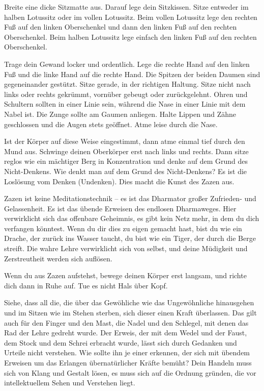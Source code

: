 \documentclass[10pt,a4paper]{article}
\begin{document}
\vskip 4pt
Breite eine dicke Sitzmatte aus. Darauf lege dein Sitzkissen. Sitze entweder im halben Lotussitz oder im vollen
Lotussitz. Beim vollen Lotussitz lege den rechten Fuß auf den linken Oberschenkel und dann den linken Fuß auf
den rechten Oberschenkel. Beim halben Lotussitz lege einfach den linken Fuß auf den rechten Oberschenkel.

\vskip 4pt
Trage dein Gewand locker und ordentlich. Lege die rechte Hand auf den linken Fuß und die linke Hand auf die
rechte Hand. Die Spitzen der beiden Daumen sind gegeneinander gestützt. Sitze gerade, in der richtigen Haltung.
Sitze nicht nach links oder rechts gekrümmt, vornüber gebeugt oder zurückgelehnt. Ohren und Schultern sollten
in einer Linie sein, während die Nase in einer Linie mit dem Nabel ist. Die Zunge sollte am Gaumen anliegen. Halte
Lippen und Zähne geschlossen und die Augen stets geöffnet. Atme leise durch die Nase.

\vskip 4pt
Ist der Körper auf diese Weise eingestimmt, dann atme einmal tief durch den Mund aus. Schwinge deinen
Oberkörper erst nach links und rechts. Dann sitze reglos wie ein mächtiger Berg in Konzentration und denke auf
dem Grund des Nicht-Denkens. Wie denkt man auf dem Grund des Nicht-Denkens? Es ist die Loslösung vom
Denken (Undenken). Dies macht die Kunst des Zazen aus.

\vskip 4pt
Zazen ist keine Meditationstechnik – es ist das Dharmator großer Zufrieden- und Gelassenheit. Es ist das übende
Erweisen des endlosen Dharmaweges. Hier verwirklicht sich das offenbare Geheimnis, es gibt kein Netz mehr, in
dem du dich verfangen könntest. Wenn du dir dies zu eigen gemacht hast, bist du wie ein Drache, der zurück ins
Wasser taucht, du bist wie ein Tiger, der durch die Berge streift. Die wahre Lehre verwirklicht sich von selbst, und
deine Müdigkeit und Zerstreutheit werden sich auflösen.

\vskip 4pt
Wenn du aus Zazen aufstehst, bewege deinen Körper erst langsam, und richte dich dann in Ruhe auf. Tue es nicht
Hals über Kopf.

\vskip 4pt
Siehe, dass all die, die über das Gewöhliche wie das Ungewöhnliche hinausgehen und im Sitzen wie im Stehen
sterben, sich dieser einen Kraft überlassen. Das gilt auch für den Finger und den Mast, die Nadel und den Schlegel,
mit denen das Rad der Lehre gedreht wurde. Der Erweis, der mit dem Wedel und der Faust, dem Stock und dem
Schrei erbracht wurde, lässt sich durch Gedanken und Urteile nicht verstehen. Wie sollte ihn je einer erkennen,
der sich mit übendem Erweisen um das Erlangen übernatürlicher Kräfte bemüht? Dein Handeln muss sich von
Klang und Gestalt lösen, es muss sich auf die Ordnung gründen, die vor intellektuellem Sehen und Verstehen liegt.
\end{document}
